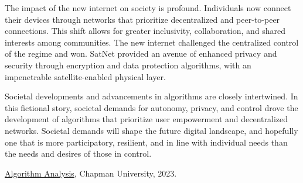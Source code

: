 \documentclass{article}
\theoremstyle{theorem}
\theoremstyle{definition}
\theoremstyle{remark}
\begin{document}
The impact of the new internet on society is profound. Individuals now connect their devices through networks that prioritize decentralized and peer-to-peer connections. This shift allows for greater inclusivity, collaboration, and shared interests among communities. The new internet challenged the centralized control of the regime and won. SatNet provided an avenue of enhanced privacy and security through encryption and data protection algorithms, with an impenetrable satellite-enabled physical layer.

Societal developments and advancements in algorithms are closely intertwined. In this fictional story, societal demands for autonomy, privacy, and control drove the development of algorithms that prioritize user empowerment and decentralized networks. Societal demands will shape the future digital landscape, and hopefully one that is more participatory, resilient, and in line with individual needs than the needs and desires of those in control.


\begin{thebibliography}{99}
 \href{https://github.com/alexhkurz/algorithm-analysis-2023}{Algorithm Analysis}, Chapman University, 2023.
\end{thebibliography}
\end{document}
